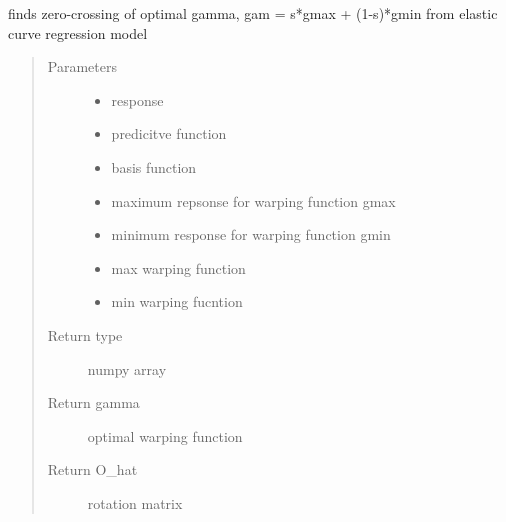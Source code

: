 \documentclass[letterpaper,10pt,english]{sphinxmanual}
\begin{document}

\begin{fulllineitems}
\label{\detokenize{curve_functions:curve_functions.curve_zero_crossing}}
finds zero-crossing of optimal gamma, gam = s*gmax + (1-s)*gmin
from elastic curve regression model
\begin{quote}\begin{description}
\item[{Parameters}] \leavevmode\begin{itemize}
\item {} 
 \textendash{} response

\item {} 
 \textendash{} predicitve function

\item {} 
 \textendash{} basis function

\item {} 
 \textendash{} maximum repsonse for warping function gmax

\item {} 
 \textendash{} minimum response for warping function gmin

\item {} 
 \textendash{} max warping function

\item {} 
 \textendash{} min warping fucntion

\end{itemize}

\item[{Return type}] \leavevmode
numpy array

\item[{Return gamma}] \leavevmode
optimal warping function

\item[{Return O\_hat}] \leavevmode
rotation matrix

\end{description}\end{quote}

\end{fulllineitems}
\end{document}
